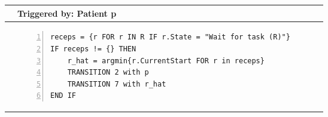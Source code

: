 \begin{tabular}{@{}>{\raggedright\arraybackslash}p{0.25cm}>{\raggedright\arraybackslash}p{13cm}@{}}
  \toprule
   & Triggered by: Patient p\\ \midrule 
  &
\vspace{-12pt}
\begin{Verbatim}[numbers=left]
receps = {r FOR r IN R IF r.State = "Wait for task (R)"}
IF receps != {} THEN 
    r_hat = argmin{r.CurrentStart FOR r in receps}
    TRANSITION 2 with p
    TRANSITION 7 with r_hat
END IF
  \end{Verbatim}
  \\ \bottomrule
  \end{tabular}